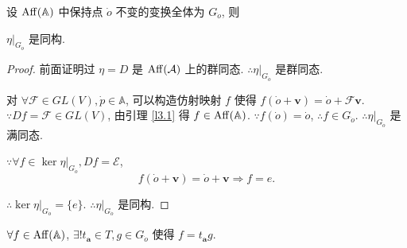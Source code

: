 \documentclass[color=black,device=normal,lang=cn,mode=geye]{elegantnote}
\begin{document}
设 $\operatorname{Aff} (\mathbb{A})$ 中保持点 $\dot{o}$ 不变的变换全体为 $G_{\dot{o}}$, 则
\begin{lemma}\label{l3.3}
    $\eta|_{G_{\dot{o}}}$ 是同构.
\end{lemma}
\begin{proof}
    前面证明过 $\eta=D$ 是 $\operatorname{Aff} (\mathcal{A})$ 上的群同态. $\therefore\eta|_{G_{\dot{o}}}$ 是群同态.

    对 $\forall\mathcal{F}\in GL (V),\dot{p}\in\mathbb{A}$, 可以构造仿射映射 $f$ 使得 $f(\dot{o}+\boldsymbol{v})=\dot{o}+\mathcal{F}\boldsymbol{v}$. $\because Df=\mathcal{F}\in GL (V)$, 由引理 \ref{l3.1} 得 $f\in\operatorname{Aff} (\mathbb{A})$. $\because f(\dot{o})=\dot{o}$, $\therefore f\in G_{\dot{o}}$. $\therefore \eta|_{G_{\dot{o}}}$ 是满同态.
    
    $\because\forall f\in\ker\eta|_{G_{\dot{o}}},Df=\mathcal{E}$,
    \[f(\dot{o}+\boldsymbol{v})=\dot{o}+\boldsymbol{v}\Rightarrow f=e.\]

    $\therefore\ker\eta|_{G_{\dot{o}}}=\{e\}$. $\therefore\eta|_{G_{\dot{o}}}$ 是同构.
\end{proof}
\begin{theorem}\label{t3.1}
    $\forall f\in\operatorname{Aff} (\mathbb{A})$, $\exists!t_{\boldsymbol{a}}\in T,g\in G_{\dot{o}}$ 使得 $f=t_{\boldsymbol{a}}g$.
\end{theorem}
\end{document}
